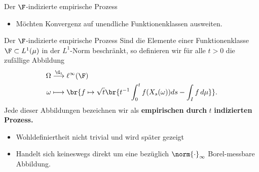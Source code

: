 \begin{frame}{Der $\F$-indizierte empirische Prozess}
    \begin{itemize}
        \item Möchten Konvergenz auf unendliche Funktionenklassen ausweiten.
    \end{itemize}
    \begin{definitionblockname}{Der $\F$-indizierte empirische Prozess}
    Sind die Elemente einer Funktionenklasse $\F \subset L^1(\mu)$ in der $L^1$-Norm beschränkt, so definieren wir für alle $t >0$ die zufällige Abbildung \begin{align*}
        \Omega &\overset{\G_t}{\longrightarrow} \ell^\infty(\F) \\
        \omega &\longmapsto \br{f \mapsto \sqrt{t}\br{t^{-1}\int_0^t f(X_s(\omega)) ds - \int_I f\,d\mu}}.
    \end{align*}
Jede dieser Abbildungen bezeichnen wir als \textbf{empirischen durch} $t$ \textbf{ indizierten Prozess.}
    \end{definitionblockname}
    \pause
    \begin{itemize}
       \item Wohldefiniertheit 
       nicht trivial und wird später gezeigt
        \item Handelt sich keineswegs direkt um eine bezüglich $\norm{\cdot}_\infty$ Borel-messbare Abbildung. 
    \end{itemize}
\end{frame}

